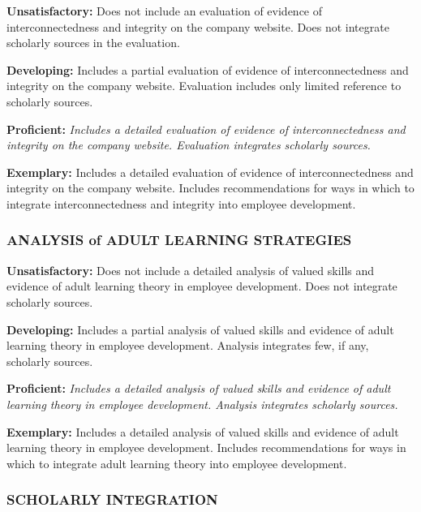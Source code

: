 \documentclass[
]{book}
\begin{document}
\textbf{Unsatisfactory:} Does not include an evaluation of evidence of interconnectedness and integrity
on the company website. Does not integrate scholarly sources in the evaluation.

\textbf{Developing:} Includes a partial evaluation of evidence of interconnectedness and integrity on
the company website. Evaluation includes only limited reference to scholarly
sources.

\textbf{Proficient:} \emph{Includes a detailed evaluation of evidence of interconnectedness and integrity
on the company website. Evaluation integrates scholarly sources.}

\textbf{Exemplary:} Includes a detailed evaluation of evidence of interconnectedness and integrity
on the company website. Includes recommendations for ways in which to integrate
interconnectedness and integrity into employee development.

\hypertarget{analysis-of-adult-learning-strategies}{%
\subsubsection*{ANALYSIS of ADULT LEARNING STRATEGIES}\label{analysis-of-adult-learning-strategies}}

\textbf{Unsatisfactory:} Does not include a detailed analysis of valued skills and evidence of adult
learning theory in employee development. Does not integrate scholarly sources.

\textbf{Developing:} Includes a partial analysis of valued skills and evidence of adult learning
theory in employee development. Analysis integrates few, if any, scholarly
sources.

\textbf{Proficient:} \emph{Includes a detailed analysis of valued skills and evidence of adult learning
theory in employee development. Analysis integrates scholarly sources.}

\textbf{Exemplary:} Includes a detailed analysis of valued skills and evidence of adult learning
theory in employee development. Includes recommendations for ways in which to
integrate adult learning theory into employee development.

\hypertarget{scholarly-integration-1}{%
\subsubsection*{SCHOLARLY INTEGRATION}\label{scholarly-integration-1}}
\end{document}
